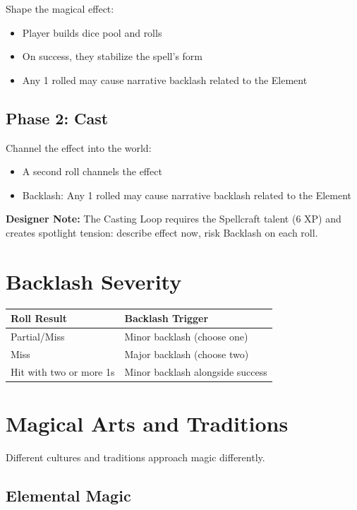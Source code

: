\documentclass[11pt,twoside,openany]{book}
\begin{document}
Shape the magical effect:
\begin{itemize}
\item Player builds dice pool and rolls
\item On success, they stabilize the spell's form
\item Any 1 rolled may cause narrative backlash related to the Element
\end{itemize}

\subsection*{Phase 2: Cast}

Channel the effect into the world:
\begin{itemize}
\item A second roll channels the effect
\item Backlash: Any 1 rolled may cause narrative backlash related to the Element
\end{itemize}

\textbf{Designer Note:} The Casting Loop requires the Spellcraft talent (6 XP) and creates spotlight tension: describe effect now, risk Backlash on each roll.

\section*{Backlash Severity} 

\begin{center}
\begin{tabular}{|l|l|}
\hline
\textbf{Roll Result} & \textbf{Backlash Trigger} \\
\hline
Partial/Miss & Minor backlash (choose one) \\
Miss & Major backlash (choose two) \\
Hit with two or more 1s & Minor backlash alongside success \\
\hline
\end{tabular}
\end{center}

\section*{Magical Arts and Traditions} 

Different cultures and traditions approach magic differently.

\subsection*{Elemental Magic}
\end{document}
